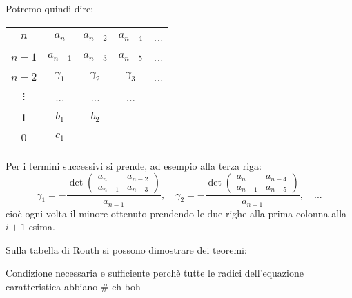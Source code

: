 \documentclass[a4paper,11pt]{article}
\begin{document}
Potremo quindi dire:
\begin{table}[h!]
	\center 
	\begin{tabular} { c | c c c c }
		$n$ & $a_n$ & $a_{n - 2}$ & $a_{n - 4}$ & ... \\
		$n - 1$ & $a_{n - 1}$ & $a_{n - 3}$ & $a_{n - 5}$ & ... \\
		$n - 2$ & $\gamma_1$ & $\gamma_2$ & $\gamma_3$ & ... \\
		$\vdots$ & ... & ... & ... \\
		1 & $b_1$ & $b_2$ \\
		0 & $c_1$
	\end{tabular}
\end{table}

Per i termini successivi si prende, ad esempio alla terza riga:
$$
\gamma_1 = - \frac{ \det \begin{pmatrix}
	a_n & a_{n - 2} \\
	a_{n - 1} & a_{n - 3}
\end{pmatrix} }{a_{n - 1}}, \quad
\gamma_2 = - \frac{ \det \begin{pmatrix}
	a_n & a_{n - 4} \\
	a_{n - 1} & a_{n - 5}
\end{pmatrix} }{a_{n - 1}}, \quad ...
$$
cioè ogni volta il minore ottenuto prendendo le due righe alla prima colonna  alla $i + 1$-esima.

Sulla tabella di Routh si possono dimostrare dei teoremi:
\begin{theorem}{}
	Condizione necessaria e sufficiente perchè tutte le radici dell'equazione caratteristica abbiano # eh boh
\end{theorem}
\end{document}

